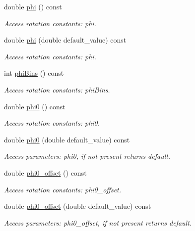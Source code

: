 \begin{DoxyCompactItemize}
double \hyperlink{struct_d_d4hep_1_1_x_m_l_1_1_dimension_a60adab36dd6958f9602ad3d9e8aa75bc}{phi} () const
\begin{DoxyCompactList}\small\item\em Access rotation constants\+: phi. \end{DoxyCompactList}\item 
double \hyperlink{struct_d_d4hep_1_1_x_m_l_1_1_dimension_a2d6b45fde139dcafc95ffe8b579aa807}{phi} (double default\+\_\+value) const
\begin{DoxyCompactList}\small\item\em Access rotation constants\+: phi. \end{DoxyCompactList}\item 
int \hyperlink{struct_d_d4hep_1_1_x_m_l_1_1_dimension_a362307eb0c24e97c0ab42af955a0d12c}{phi\+Bins} () const
\begin{DoxyCompactList}\small\item\em Access rotation constants\+: phi\+Bins. \end{DoxyCompactList}\item 
double \hyperlink{struct_d_d4hep_1_1_x_m_l_1_1_dimension_a94f376b5c43b1260665560d293205a36}{phi0} () const
\begin{DoxyCompactList}\small\item\em Access rotation constants\+: phi0. \end{DoxyCompactList}\item 
double \hyperlink{struct_d_d4hep_1_1_x_m_l_1_1_dimension_a5533d96a01cca0ca36425ddcd92b9ba1}{phi0} (double default\+\_\+value) const
\begin{DoxyCompactList}\small\item\em Access parameters\+: phi0, if not present returns default. \end{DoxyCompactList}\item 
double \hyperlink{struct_d_d4hep_1_1_x_m_l_1_1_dimension_a77abf5ceffbbed79a099356379a2e5d1}{phi0\+\_\+offset} () const
\begin{DoxyCompactList}\small\item\em Access rotation constants\+: phi0\+\_\+offset. \end{DoxyCompactList}\item 
double \hyperlink{struct_d_d4hep_1_1_x_m_l_1_1_dimension_a28538f2901b45889ec18404d0b788c3e}{phi0\+\_\+offset} (double default\+\_\+value) const
\begin{DoxyCompactList}\small\item\em Access parameters\+: phi0\+\_\+offset, if not present returns default. \end{DoxyCompactList}\item 

\end{DoxyCompactItemize}
